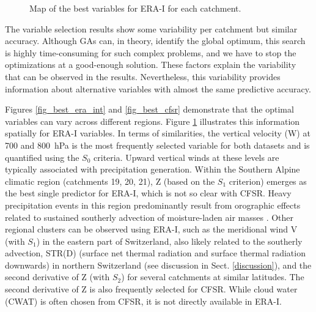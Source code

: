 \documentclass[draft]{agujournal2019}
\begin{document}
\begin{figure}[hbt]
	\noindent{}
	\caption{Map of the best variables for ERA-I for each catchment.}
	\label{fig_map_variables}
\end{figure}

The variable selection results show some variability per catchment but similar accuracy. Although GAs can, in theory, identify the global optimum, this search is highly time-consuming for such complex problems, and we have to stop the optimizations at a good-enough solution. These factors explain the variability that can be observed in the results. Nevertheless, this variability provides information about alternative variables with almost the same predictive accuracy.

Figures \ref{fig_best_era_int} and \ref{fig_best_cfsr} demonstrate that the optimal variables can vary across different regions. Figure \ref{fig_map_variables} illustrates this information spatially for ERA-I variables. In terms of similarities, the vertical velocity (W) at 700 and 800~hPa is the most frequently selected variable for both datasets and is quantified using the $S_{0}$ criteria. Upward vertical winds at these levels are typically associated with precipitation generation. Within the Southern Alpine climatic region (catchments 19, 20, 21), Z (based on the $S_{1}$ criterion) emerges as the best single predictor for ERA-I, which is not so clear with CFSR. Heavy precipitation events in this region predominantly result from orographic effects related to sustained southerly advection of moisture-laden air masses \cite{Massacand1998}. Other regional clusters can be observed using ERA-I, such as the meridional wind V (with $S_{1}$) in the eastern part of Switzerland, also likely related to the southerly advection, STR(D) (surface net thermal radiation and surface thermal radiation downwards) in northern Switzerland (see discussion in Sect. \ref{discussion}), and the second derivative of Z (with $S_{2}$) for several catchments at similar latitudes. The second derivative of Z is also frequently selected for CFSR. While cloud water (CWAT) is often chosen from CFSR, it is not directly available in ERA-I.
\end{document}
